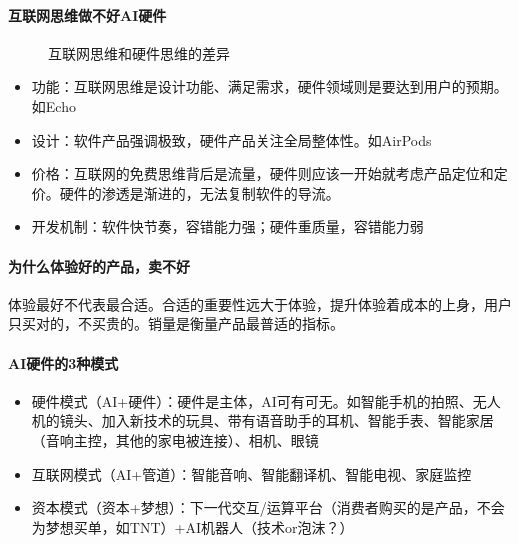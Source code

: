 \documentclass[letterpaper,11pt,english]{sphinxmanual}
\begin{document}
\paragraph{互联网思维做不好AI硬件}
\label{\detokenize{chapter_project/AI_hardware:id12}}
\begin{figure}[H]
\centering
\capstart

\noindent{}
\caption{互联网思维和硬件思维的差异}\label{\detokenize{chapter_project/AI_hardware:id28}}\end{figure}
\begin{itemize}
\item {} 
功能：互联网思维是设计功能、满足需求，硬件领域则是要达到用户的预期。如Echo

\item {} 
设计：软件产品强调极致，硬件产品关注全局整体性。如AirPods

\item {} 
价格：互联网的免费思维背后是流量，硬件则应该一开始就考虑产品定位和定价。硬件的渗透是渐进的，无法复制软件的导流。

\item {} 
开发机制：软件快节奏，容错能力强；硬件重质量，容错能力弱

\end{itemize}


\paragraph{为什么体验好的产品，卖不好}
\label{\detokenize{chapter_project/AI_hardware:id13}}
体验最好不代表最合适。合适的重要性远大于体验，提升体验着成本的上身，用户只买对的，不买贵的。销量是衡量产品最普适的指标。


\paragraph{AI硬件的3种模式}
\label{\detokenize{chapter_project/AI_hardware:ai3}}\begin{itemize}
\item {} 
硬件模式（AI+硬件）：硬件是主体，AI可有可无。如智能手机的拍照、无人机的镜头、加入新技术的玩具、带有语音助手的耳机、智能手表、智能家居（音响主控，其他的家电被连接）、相机、眼镜

\item {} 
互联网模式（AI+管道）：智能音响、智能翻译机、智能电视、家庭监控

\item {} 
资本模式（资本+梦想）：下一代交互/运算平台（消费者购买的是产品，不会为梦想买单，如TNT）+AI机器人（技术or泡沫？）

\end{itemize}
\end{document}
